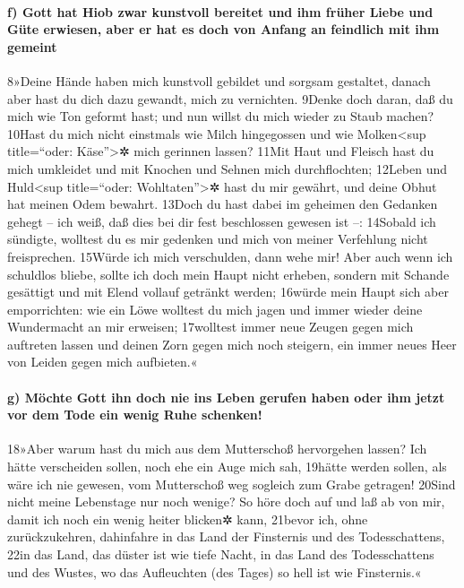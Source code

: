 \hypertarget{f-gott-hat-hiob-zwar-kunstvoll-bereitet-und-ihm-fruxfcher-liebe-und-guxfcte-erwiesen-aber-er-hat-es-doch-von-anfang-an-feindlich-mit-ihm-gemeint}{%
\paragraph{f) Gott hat Hiob zwar kunstvoll bereitet und ihm früher Liebe
und Güte erwiesen, aber er hat es doch von Anfang an feindlich mit ihm
gemeint}\label{f-gott-hat-hiob-zwar-kunstvoll-bereitet-und-ihm-fruxfcher-liebe-und-guxfcte-erwiesen-aber-er-hat-es-doch-von-anfang-an-feindlich-mit-ihm-gemeint}}

8»Deine Hände haben mich kunstvoll gebildet und sorgsam gestaltet,
danach aber hast du dich dazu gewandt, mich zu vernichten. 9Denke doch
daran, daß du mich wie Ton geformt hast; und nun willst du mich wieder
zu Staub machen? 10Hast du mich nicht einstmals wie Milch hingegossen
und wie Molken\textless sup title=``oder: Käse''\textgreater✲ mich
gerinnen lassen? 11Mit Haut und Fleisch hast du mich umkleidet und mit
Knochen und Sehnen mich durchflochten; 12Leben und Huld\textless sup
title=``oder: Wohltaten''\textgreater✲ hast du mir gewährt, und deine
Obhut hat meinen Odem bewahrt. 13Doch du hast dabei im geheimen den
Gedanken gehegt -- ich weiß, daß dies bei dir fest beschlossen gewesen
ist --: 14Sobald ich sündigte, wolltest du es mir gedenken und mich von
meiner Verfehlung nicht freisprechen. 15Würde ich mich verschulden, dann
wehe mir! Aber auch wenn ich schuldlos bliebe, sollte ich doch mein
Haupt nicht erheben, sondern mit Schande gesättigt und mit Elend vollauf
getränkt werden; 16würde mein Haupt sich aber emporrichten: wie ein Löwe
wolltest du mich jagen und immer wieder deine Wundermacht an mir
erweisen; 17wolltest immer neue Zeugen gegen mich auftreten lassen und
deinen Zorn gegen mich noch steigern, ein immer neues Heer von Leiden
gegen mich aufbieten.«

\hypertarget{g-muxf6chte-gott-ihn-doch-nie-ins-leben-gerufen-haben-oder-ihm-jetzt-vor-dem-tode-ein-wenig-ruhe-schenken}{%
\paragraph{g) Möchte Gott ihn doch nie ins Leben gerufen haben oder ihm
jetzt vor dem Tode ein wenig Ruhe
schenken!}\label{g-muxf6chte-gott-ihn-doch-nie-ins-leben-gerufen-haben-oder-ihm-jetzt-vor-dem-tode-ein-wenig-ruhe-schenken}}

18»Aber warum hast du mich aus dem Mutterschoß hervorgehen lassen? Ich
hätte verscheiden sollen, noch ehe ein Auge mich sah, 19hätte werden
sollen, als wäre ich nie gewesen, vom Mutterschoß weg sogleich zum Grabe
getragen! 20Sind nicht meine Lebenstage nur noch wenige? So höre doch
auf und laß ab von mir, damit ich noch ein wenig heiter blicken✲ kann,
21bevor ich, ohne zurückzukehren, dahinfahre in das Land der Finsternis
und des Todesschattens, 22in das Land, das düster ist wie tiefe Nacht,
in das Land des Todesschattens und des Wustes, wo das Aufleuchten (des
Tages) so hell ist wie Finsternis.«

